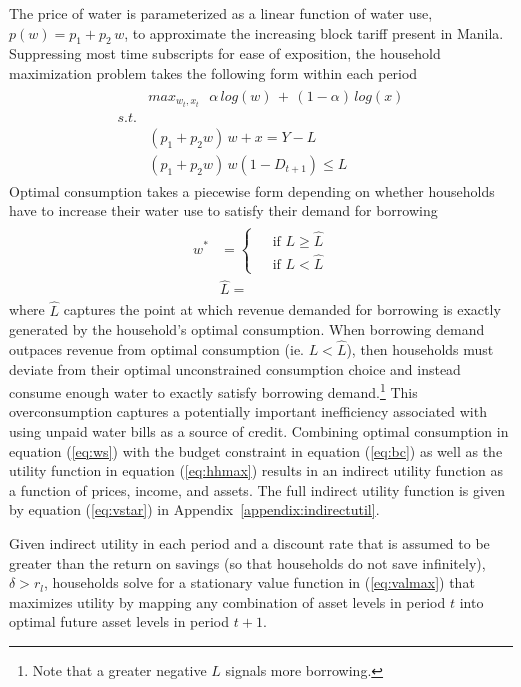 \documentclass[12pt]{article}
\begin{document}
The price of water is parameterized as a linear function of water use, $p(w) = p_1 + p_2 \, w$, to approximate the increasing block tariff present in Manila.  Suppressing most time subscripts for ease of exposition, the household maximization problem takes the following form within each period
\begin{align}\label{eq:hhmax}
\begin{split}
&max_{w_t,x_t} \,\,\,\, \alpha\, log(w) \, + \, (1-\alpha)\,log(x) \\
s.t.& \\
\,\,\,\, &(p_1 + p_2 w)\,w + x  =  Y - L \\
&(p_1 + p_2 w)\,w (1-D_{t+1}) \leq L  
\end{split}
\end{align}
Optimal consumption takes a piecewise form depending on whether households have to increase their water use to satisfy their demand for borrowing
\begin{align}\label{eq:ws}
\begin{split}
w^{*} &= 
\begin{cases}
 &\text{ if } L \geq \widehat{L} \\
 &\text{ if } L < \widehat{L}
\end{cases} \\
&\widehat{L} = 
\end{split}
\end{align}
where $\widehat{L}$ captures the point at which revenue demanded for borrowing is exactly generated by the household's optimal consumption.  When borrowing demand outpaces revenue from optimal consumption (ie. $L<\widehat{L}$), then households must deviate from their optimal unconstrained consumption choice and instead consume enough water to exactly satisfy borrowing demand.\footnote{Note that a greater negative $L$ signals more borrowing.}  This overconsumption captures a potentially important inefficiency associated with using unpaid water bills as a source of credit.  Combining optimal consumption in equation (\ref{eq:ws}) with the budget constraint in equation (\ref{eq:bc}) as well as the utility function in equation (\ref{eq:hhmax}) results in an indirect utility function as a function of prices, income, and assets.  The full indirect utility function is given by equation (\ref{eq:vstar}) in Appendix~\ref{appendix:indirectutil}.

Given indirect utility in each period and a discount rate that is assumed to be greater than the return on savings (so that households do not save infinitely), $\delta> r_l$, households solve for a stationary value function in (\ref{eq:valmax}) that maximizes utility by mapping any combination of asset levels in period $t$ into optimal future asset levels in period $t+1$.
\end{document}
